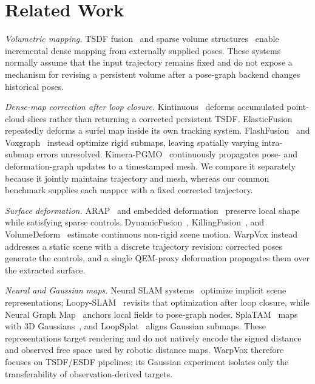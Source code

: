 \section{Related Work}
\label{sec:related}

\vspace{1mm}\noindent\textit{Volumetric mapping.}
TSDF fusion~\cite{10.1145/3596711.3596726,newcombe2011kinectfusion} and sparse volume structures~\cite{10.1145/2508363.2508374,Oleynikova_2017,vizzo2022vdbfusion} enable incremental dense mapping from externally supplied poses. These systems normally assume that the input trajectory remains fixed and do not expose a mechanism for revising a persistent volume after a pose-graph backend changes historical poses.

\vspace{1mm}\noindent\textit{Dense-map correction after loop closure.}
Kintinuous~\cite{whelan2015kintinuous} deforms accumulated point-cloud slices rather than returning a corrected persistent TSDF. ElasticFusion~\cite{whelan2016elasticfusion} repeatedly deforms a surfel map inside its own tracking system. FlashFusion~\cite{han2018flashfusion} and Voxgraph~\cite{reijgwart2020voxgraph} instead optimize rigid submaps, leaving spatially varying intra-submap errors unresolved. Kimera-PGMO~\cite{kimera_pgmo} continuously propagates pose- and deformation-graph updates to a timestamped mesh. We compare it separately because it jointly maintains trajectory and mesh, whereas our common benchmark supplies each mapper with a fixed corrected trajectory.

\vspace{1mm}\noindent\textit{Surface deformation.}
ARAP~\cite{ARAP_modeling:2007} and embedded deformation~\cite{10.1145/1276377.1276478} preserve local shape while satisfying sparse controls. DynamicFusion~\cite{7298631}, KillingFusion~\cite{slavcheva2017killingfusion}, and VolumeDeform~\cite{innmann2016volumedeform} estimate continuous non-rigid scene motion. WarpVox instead addresses a static scene with a discrete trajectory revision: corrected poses generate the controls, and a single QEM-proxy deformation propagates them over the extracted surface.

\vspace{1mm}\noindent\textit{Neural and Gaussian maps.}
Neural SLAM systems~\cite{sucar2021imap,zhu2022niceslam,cui2023ngelslam} optimize implicit scene representations; Loopy-SLAM~\cite{liso2024loopyslam} revisits that optimization after loop closure, while Neural Graph Map~\cite{bruns2024neuralgraphmap} anchors local fields to pose-graph nodes. SplaTAM~\cite{keetha2024splatam} maps with 3D Gaussians~\cite{kerbl2023gaussians}, and LoopSplat~\cite{zhu2025loopsplat} aligns Gaussian submaps. These representations target rendering and do not natively encode the signed distance and observed free space used by robotic distance maps. WarpVox therefore focuses on TSDF/ESDF pipelines; its Gaussian experiment isolates only the transferability of observation-derived targets.

